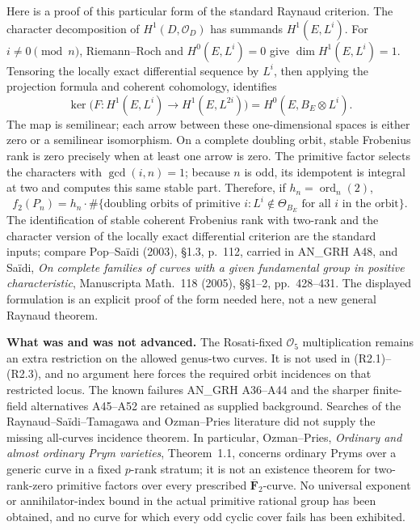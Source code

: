 \documentclass[11pt,a4paper]{article}
\theoremstyle{definition}
\renewcommand{\paragraph}[1]{\par\smallskip\noindent\textbf{#1}\quad\ignorespaces}
\begin{document}
Here is a proof of this particular form of the standard
Raynaud criterion. The character decomposition of
$H^1(D,\mathcal O_D)$ has summands $H^1(E,L^i)$.
For $i\ne0\pmod n$, Riemann--Roch and $H^0(E,L^i)=0$
give $\dim H^1(E,L^i)=1$. Tensoring the locally exact
differential sequence by $L^i$, then applying the projection
formula and coherent cohomology, identifies
\[
 \ker\bigl(F:H^1(E,L^i)\to H^1(E,L^{2i})\bigr)
       =H^0(E,B_E\otimes L^i).                              \tag{R2.2}
\]
The map is semilinear; each arrow between these one-dimensional
spaces is either zero or a semilinear isomorphism.
On a complete doubling orbit, stable Frobenius rank is zero
precisely when at least one arrow is zero. The primitive
factor selects the characters with $\gcd(i,n)=1$; because
$n$ is odd, its idempotent is integral at two and computes
this same stable part. Therefore, if
$h_n=\operatorname{ord}_n(2)$,
\[
 f_2(P_n)=h_n\cdot
 \#\{\text{doubling orbits of primitive }i:
                   L^i\notin\Theta_{B_E}\text{ for all }i
                   \text{ in the orbit}\}.                 \tag{R2.3}
\]
The identification of stable coherent Frobenius rank with
two-rank and the character version of the locally exact
differential criterion are the standard inputs; compare
Pop--Sa\"idi (2003), \S1.3, p.~112, carried in AN\_GRH A48,
and Sa\"idi, \emph{On complete families of curves with a
given fundamental group in positive characteristic},
Manuscripta Math.~118 (2005), \S\S1--2, pp.~428--431.
The displayed formulation is an explicit proof of the form
needed here, not a new general Raynaud theorem.

\paragraph{What was and was not advanced.}
The Rosati-fixed $\mathcal O_5$ multiplication remains an
extra restriction on the allowed genus-two curves. It is not
used in (R2.1)--(R2.3), and no argument here forces the required
orbit incidences on that restricted locus. The known failures
AN\_GRH A36--A44 and the sharper finite-field alternatives
A45--A52 are retained as supplied background. Searches of the
Raynaud--Sa\"idi--Tamagawa and Ozman--Pries literature did not
supply the missing all-curves incidence theorem. In particular,
Ozman--Pries, \emph{Ordinary and almost ordinary Prym varieties},
Theorem~1.1, concerns ordinary Pryms over a generic curve in a
fixed $p$-rank stratum; it is not an existence theorem for
two-rank-zero primitive factors over every prescribed
$\overline{\mathbf F}_2$-curve. No universal exponent or
annihilator-index bound in the actual primitive rational group
has been obtained, and no curve for which every odd cyclic
cover fails has been exhibited.
\end{document}
